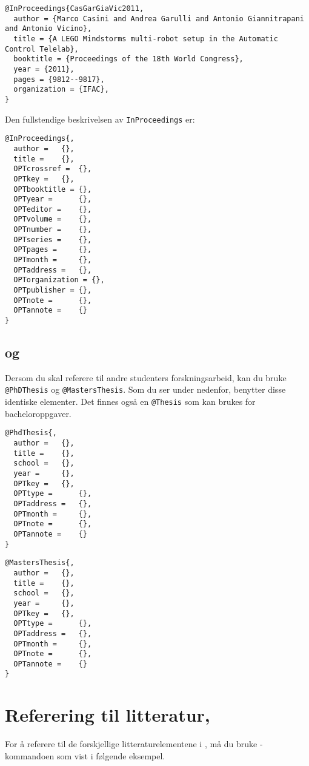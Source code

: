 \begin{boxedminipage}{160mm}
{\footnotesize{
\begin{verbatim}
@InProceedings{CasGarGiaVic2011,
  author = {Marco Casini and Andrea Garulli and Antonio Giannitrapani and Antonio Vicino},
  title = {A LEGO Mindstorms multi-robot setup in the Automatic Control Telelab},
  booktitle = {Proceedings of the 18th World Congress},
  year = {2011},
  pages = {9812--9817},
  organization = {IFAC},
}
\end{verbatim}
}}
\end{boxedminipage}

Den fullstendige beskrivelsen av {\tt InProceedings} er:

\begin{verbatim}
@InProceedings{,
  author = 	 {},
  title = 	 {},
  OPTcrossref =  {},
  OPTkey = 	 {},
  OPTbooktitle = {},
  OPTyear = 	 {},
  OPTeditor = 	 {},
  OPTvolume = 	 {},
  OPTnumber = 	 {},
  OPTseries = 	 {},
  OPTpages = 	 {},
  OPTmonth = 	 {},
  OPTaddress = 	 {},
  OPTorganization = {},
  OPTpublisher = {},
  OPTnote = 	 {},
  OPTannote = 	 {}
}
\end{verbatim}

\newpage

\subsection{ og }
Dersom du skal referere til andre studenters
forskningsarbeid, kan du bruke 
{\tt @PhDThesis} og {\tt @MastersThesis}. Som du ser under nedenfor, 
benytter disse identiske elementer.
Det finnes også en 
{\tt @Thesis} som kan brukes for bacheloroppgaver.




\begin{verbatim}
@PhdThesis{,
  author = 	 {},
  title = 	 {},
  school = 	 {},
  year = 	 {},
  OPTkey = 	 {},
  OPTtype = 	 {},
  OPTaddress = 	 {},
  OPTmonth = 	 {},
  OPTnote = 	 {},
  OPTannote = 	 {}
}
\end{verbatim}

\begin{verbatim}
@MastersThesis{,
  author = 	 {},
  title = 	 {},
  school = 	 {},
  year = 	 {},
  OPTkey = 	 {},
  OPTtype = 	 {},
  OPTaddress = 	 {},
  OPTmonth = 	 {},
  OPTnote = 	 {},
  OPTannote = 	 {}
}
\end{verbatim}

\newpage
\section{Referering til litteratur, }
For å referere til de forskjellige litteraturelementene i 
, må du bruke -kommandoen som vist i følgende eksempel.

